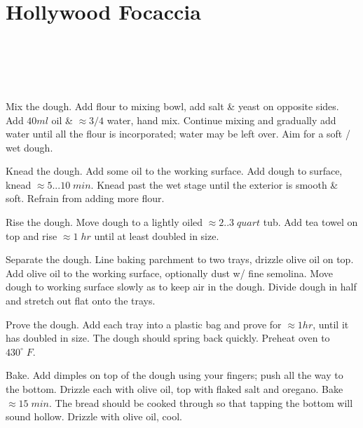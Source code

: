 \section[Focaccia]{Hollywood Focaccia}

\begin{recipestats}[
	servings=6 people,
	preptime=3 hours,
	bakingtime=15 minutes,
	source=\citefield{howToBake2013}{title} \cite{howToBake2013},
	]
\end{recipestats}

\begin{ingredientcolumns}
	\begin{ingredientblock}
		\\
		\\
	\end{ingredientblock}
	\begin{ingredientblock}
		\ingredient[140][ml]{olive oil}\\
		\ingredient[360][ml]{water}
	\end{ingredientblock}
\end{ingredientcolumns}

\begin{preparation}
\item Mix the dough.
Add flour to mixing bowl, add salt \& yeast on opposite sides.
Add $40ml$ oil \& $\approx 3/4$ water, hand mix.
Continue mixing and gradually add water until all the flour is incorporated; water may be left over.
Aim for a soft / wet dough.

\item Knead the dough.
Add some oil to the working surface.
Add dough to surface, knead $\approx 5...10\;min$.
Knead past the wet stage until the exterior is smooth \& soft.
Refrain from adding more flour.

\item Rise the dough.
Move dough to a lightly oiled $\approx 2..3\; quart$ tub.
Add tea towel on top and rise $\approx 1\;hr$ until at least doubled in size.

\item Separate the dough.
Line baking parchment to two trays, drizzle olive oil on top.
Add olive oil to the working surface, optionally dust w/ fine semolina.
Move dough to working surface slowly as to keep air in the dough.
Divide dough in half and stretch out flat onto the trays.

\item Prove the dough.
Add each tray into a plastic bag and prove for $\approx 1 hr$, until it has doubled in size.
The dough should spring back quickly.
Preheat oven to $430^\circ \; F$.

\item Bake.
Add dimples on top of the dough using your fingers; push all the way to the bottom.
Drizzle each with olive oil, top with flaked salt and oregano.
Bake $\approx 15 \; min$.
The bread should be cooked through so that tapping the bottom will sound hollow.
Drizzle with olive oil, cool.

\end{preparation}

\recipeend
